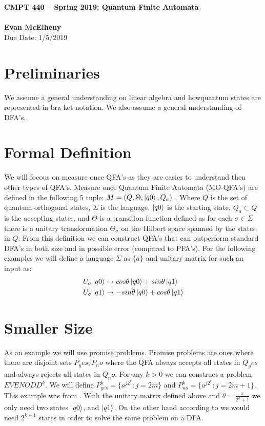 \documentclass[letter, 12pt]{article}
\begin{document}
\noindent
\large\textbf{CMPT 440 -- Spring 2019: Quantum Finite Automata} \\ \\
\textbf{Evan McElheny} \\
\normalsize   Due Date: 1/5/2019


\section*{Preliminaries}
We assume a general understanding on linear algebra and howquantum states are represented in bra-ket notation.  We also assume a general understanding of DFA's.
\section{Formal Definition}
We will focous on measure once QFA's as they are easier to understand then other types of QFA's.  Measure once Quantum Finite Automata (MO-QFA's) are defined in the following 5 tuple: $M = (Q, \Theta, \ket{q0}, Q_a)$ \cite{1way}.  Where $Q$ is the set of quantum orthogonal states, $\Sigma$ is the language, $\ket{q0}$ is the starting state, $Q_a \subset Q$ is the accepting states, and $\Theta$ is a transition function defined as for each $\sigma \in \Sigma$ there is a unitary transformation $\Theta_\sigma$ on the Hilbert space spanned by the states in $Q$.  From this definition we can construct QFA's that can outperform standard DFA's in both size and in possible error (compared to PFA's).
For the following examples we will define a language $\Sigma$ as $\{a\}$ and unitary matrix for such an input as:
\begin{align}
U_\sigma \ket{q0} &\rightarrow cos\theta \ket{q0} + sin\theta \ket{q1} \\
U_\sigma \ket{q1} &\rightarrow -sin\theta \ket{q0} + cos\theta \ket{q1}
\end{align}
\section{Smaller Size}
As an example we will use promise problems.  Promise problems are ones where there are disjoint sets $P_yes, P_no$ where the QFA always accepts all states in $Q_yes$ and always rejects all states in $Q_no$.  For any $k > 0$ we can construct a problem $EVENODD^k$.  We will define $P_{yes}^k = \{a^{j2^{k}} : j = 2m\}$ and $P_{no}^k = \{a^{j2^{k}} : j = 2m + 1\}$.  This example was from \cite{moddern}.  With the unitary matrix defined above and $\theta = \frac{\pi}{2^k + 1}$ we only need two states $\ket{q0}$, and $\ket{q1}$.  On the other hand according to \cite{promise} we would need $2^{k + 1}$ states in order to solve the same problem on a DFA.  
\end{document}
